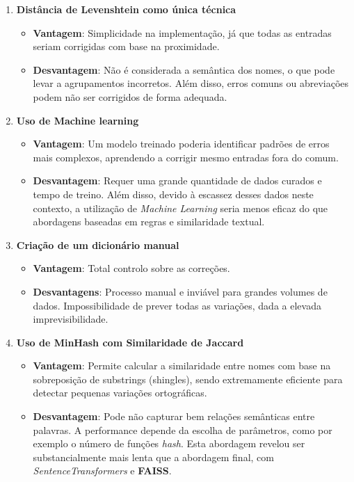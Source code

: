 \documentclass[a4paper,12pt]{article}
\begin{document}
\label{sec:MinHash}
\begin{enumerate}
    \item \textbf{Distância de Levenshtein como única técnica}  
    \begin{itemize}
        \item \textbf{Vantagem}: Simplicidade na implementação, já que todas as entradas seriam corrigidas com base na proximidade.
        \item \textbf{Desvantagem}: Não é considerada a semântica dos nomes, o que pode levar a agrupamentos incorretos. Além disso, erros comuns ou abreviações podem não ser corrigidos de forma adequada.
    \end{itemize}
    
    \item \textbf{Uso de Machine learning}  
    \begin{itemize}
        \item \textbf{Vantagem}: Um modelo treinado poderia identificar padrões de erros mais complexos, aprendendo a corrigir mesmo entradas fora do comum.
        \item \textbf{Desvantagem}: Requer uma grande quantidade de dados curados e tempo de treino. Além disso, devido à escassez desses dados neste contexto, a utilização de \textit{Machine Learning} seria menos eficaz do que abordagens baseadas em regras e similaridade textual.
    \end{itemize}
    
    \item \textbf{Criação de um dicionário manual}  
    \begin{itemize}
        \item \textbf{Vantagem}: Total controlo sobre as correções.
        \item \textbf{Desvantagens}: Processo manual e inviável para grandes volumes de dados. Impossibilidade de prever todas as variações, dada a elevada imprevisibilidade.
    \end{itemize}

    \item \textbf{Uso de MinHash com Similaridade de Jaccard}  
    \begin{itemize}
        \item \textbf{Vantagem}: Permite calcular a similaridade entre nomes com base na sobreposição de substrings (shingles), sendo extremamente eficiente para detectar pequenas variações ortográficas.
        \item \textbf{Desvantagem}: Pode não capturar bem relações semânticas entre palavras. A performance depende da escolha de parâmetros, como por exemplo o número de funções \textit{hash}. Esta abordagem revelou ser substancialmente mais lenta que a abordagem final, com \textit{SentenceTransformers} e \textbf{FAISS}.
    \end{itemize}
\end{enumerate}
\end{document}
